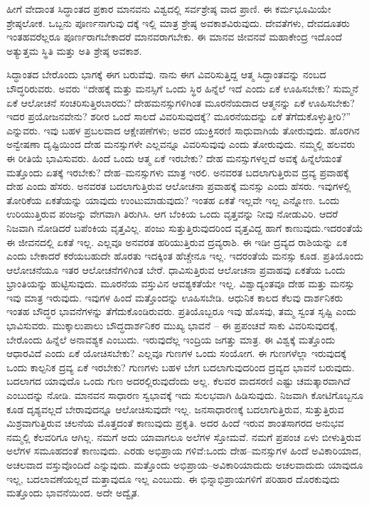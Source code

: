 ಹೀಗೆ ವೇದಾಂತ ಸಿದ್ಧಾಂತದ ಪ್ರಕಾರ ಮಾನವನು ವಿಶ್ವದಲ್ಲಿ ಸರ್ವಶ್ರೇಷ್ಠ ವಾದ ಪ್ರಾಣಿ. ಈ ಕರ್ಮಭೂಮಿಯೇ ಶ್ರೇಷ್ಠಲೋಕ. ಒಬ್ಬನು ಪೂರ್ಣನಾಗುವು ದಕ್ಕೆ ಇಲ್ಲಿ ಮಾತ್ರ ಶ್ರೇಷ್ಠ ಅವಕಾಶವಿರುವುದು. ದೇವತೆಗಳು, ದೇವದೂತರು ಇಂತಹವರೆಲ್ಲರೂ ಪೂರ್ಣರಾಗಬೇಕಾದರೆ ಮಾನವರಾಗಬೇಕು. ಈ ಮಾನವ ಜೀವನವೆ ಮಹಾಕೇಂದ್ರ ಇದೊಂದೆ ಅತ್ಯುತ್ತಮ ಸ್ಥಿತಿ ಮತ್ತು ಅತಿ ಶ್ರೇಷ್ಠ ಅವಕಾಶ.

ಸಿದ್ಧಾಂತದ ಬೇರೊಂದು ಭಾಗಕ್ಕೆ ಈಗ ಬರುವೆವು. ನಾನು ಈಗ ವಿವರಿಸುತ್ತಿದ್ದ ಆತ್ಮ ಸಿದ್ಧಾಂತವನ್ನು ನಂಬದ ಬೌದ್ಧರಿರುವರು. ಅವರು “ದೇಹಕ್ಕೆ ಮತ್ತು ಮನಸ್ಸಿಗೆ ಒಂದು ಸ್ಥಿರ ಹಿನ್ನೆಲೆ ಇದೆ ಎಂದು ಏಕೆ ಊಹಿಸಬೇಕು? ಸುಮ್ಮನೆ ಏಕೆ ಆಲೋಚನೆ ಸಂಚರಿಸುತ್ತಿರಬಾರದು? ದೇಹಮನಸ್ಸುಗಳಿಗಿಂತ ಮೂರನೆಯದಾದ ಆತ್ಮನನ್ನು ಏಕೆ ಊಹಿಸಬೇಕು? ಇದರ ಪ್ರಯೋಜನವೇನು? ಶರೀರ ಒಂದೆ ಸಾಲದೆ ವಿವರಿಸುವುದಕ್ಕೆ? ಮೂರನೆಯದನ್ನು ಏಕೆ ತೆಗೆದುಕೊಳ್ಳುತ್ತೀರಿ?” ಎನ್ನುವರು. ಇವು ಬಹಳ ಪ್ರಬಲವಾದ ಆಕ್ಷೇಪಣೆಗಳು; ಅವರ ಯುಕ್ತಿಸರಣಿ ಸಾಧುವಾಗಿಯೆ ತೋರುವುದು. ಹೊರಗಿನ ಅನ್ವೇಷಣಾ ದೃಷ್ಟಿಯಿಂದ ದೇಹ ಮನಸ್ಸುಗಳೇ ಎಲ್ಲವನ್ನೂ ವಿವರಿಸುವುವು ಎಂದು ತೋರುವುದು. ನಮ್ಮಲ್ಲಿ ಹಲವರು ಈ ರೀತಿಯೆ ಭಾವಿಸುವರು. ಹಿಂದೆ ಒಂದು ಆತ್ಮ ಏಕೆ ಇರಬೇಕು? ದೇಹ ಮನಸ್ಸುಗಳಲ್ಲದೆ ಅವಕ್ಕೆ ಹಿನ್ನೆಲೆಯಂತೆ ಮತ್ತೊಂದು ಏತಕ್ಕೆ ಇರಬೇಕು? ದೇಹ–ಮನಸ್ಸುಗಳು ಮಾತ್ರ ಇರಲಿ. ಅನವರತ ಬದಲಾಗುತ್ತಿರುವ ದ್ರವ್ಯ ಪ್ರವಾಹಕ್ಕೆ ದೇಹ ಎಂದು ಹೆಸರು. ಅನವರತ ಬದಲಾಗುತ್ತಿರುವ ಆಲೋಚನಾ ಪ್ರವಾಹಕ್ಕೆ ಮನಸ್ಸು ಎಂದು ಹೆಸರು. ಇವುಗಳಲ್ಲಿ ತೋರಿಕೆಯ ಏಕತೆಯನ್ನು ಯಾವುದು ಉಂಟುಮಾಡುವುದು? ಇಂತಹ ಏಕತೆ ಇಲ್ಲವೇ ಇಲ್ಲ ಎನ್ನೋಣ. ಒಂದು ಉರಿಯುತ್ತಿರುವ ಪಂಜನ್ನು ವೇಗವಾಗಿ ತಿರುಗಿಸಿ. ಆಗ ಬೆಂಕಿಯ ಒಂದು ವೃತ್ತವನ್ನು ನೀವು ನೋಡುವಿರಿ. ಆದರೆ ನಿಜವಾಗಿ ನೋಡಿದರೆ ಬಪೆಂಕಿಯ ವೃತ್ತವಿಲ್ಲ. ಪಂಜು ಸುತ್ತುತ್ತಿರುವುದರಿಂದ ವೃತ್ತವಿದ್ದ ಹಾಗೆ ಕಾಣುವುದು.ಇದರಂತೆಯೆ ಈ ಜೀವನದಲ್ಲಿ ಏಕತೆ ಇಲ್ಲ. ಎಲ್ಲವೂ ಅನವರತ ಹರಿಯುತ್ತಿರುವ ದ್ರವ್ಯರಾಶಿ. ಈ ಇಡೀ ದ್ರವ್ಯದ ರಾಶಿಯನ್ನು ಏಕ ಎಂದು ಬೇಕಾದರೆ ಕರೆಯಬಹುದೇ ಹೊರತು ಇದಕ್ಕಿಂತ ಹೆಚ್ಚೇನೂ ಇಲ್ಲ. ಇದರಂತೆಯೆ ಮನಸ್ಸು ಕೂಡ. ಪ್ರತಿಯೊಂದು ಆಲೋಚನೆಯೂ ಇತರ ಆಲೋಚನೆಗಳಿಗಿಂತ ಬೇರೆ. ಧಾವಿಸುತ್ತಿರುವ ಆಲೋಚನಾ ಪ್ರವಾಹವು ಏಕತೆಯ ಒಂದು ಭ್ರಾಂತಿಯನ್ನು ಹುಟ್ಟಿಸುವುದು. ಮೂರನೆಯ ವಸ್ತುವಿನ ಆವಶ್ಯಕತೆಯೇ ಇಲ್ಲ. ವಿಶ್ವಾದ್ಯಂತವೂ ದೇಹ ಮತ್ತು ಮನಸ್ಸು ಇವು ಮಾತ್ರ ಇರುವುದು. ಇವುಗಳ ಹಿಂದೆ ಮತ್ತೊಂದನ್ನು ಊಹಿಸಬೇಡಿ. ಆಧುನಿಕ ಕಾಲದ ಕೆಲವು ದಾರ್ಶನಿಕರು ಇಂತಹ ಬೌದ್ಧರ ಭಾವನೆಗಳನ್ನು ತೆಗೆದುಕೊಂಡಿರುವರು. ಪ್ರತಿಯೊಬ್ಬರೂ ಇವು ಹೊಸವು, ತಮ್ಮ ಸ್ವಂತ ಸೃಷ್ಟಿ ಎಂದು ಭಾವಿಸುವರು. ಮುಕ್ಕಾಲುಪಾಲು ಬೌದ್ಧದಾರ್ಶನಿಕರ ಮುಖ್ಯ ಭಾವನೆ – ಈ ಪ್ರಪಂಚವೆ ಸಾಕು ವಿವರಿಸುವುದಕ್ಕೆ, ಬೇರೊಂದು ಹಿನ್ನೆಲೆ ಅನಾವಶ್ಯಕ ಎಂಬುದು. ಇರುವುದೆಲ್ಲ ಇಂದ್ರಿಯ ಜಗತ್ತು ಮಾತ್ರ. ಈ ವಿಶ್ವಕ್ಕೆ ಮತ್ತೊಂದು ಆಧಾರವಿದೆ ಎಂದು ಏಕೆ ಯೋಚಿಸಬೇಕು? ಎಲ್ಲವೂ ಗುಣಗಳ ಒಂದು ಸಂಯೋಗ. ಈ ಗುಣಗಳೆಲ್ಲಾ ಇರುವುದಕ್ಕೆ ಒಂದು ಕಾಲ್ಪನಿಕ ದ್ರವ್ಯ ಏಕೆ ಇರಬೇಕು? ಗುಣಗಳು ಬಹಳ ಬೇಗ ಬದಲಾಗುವುದರಿಂದ ದ್ರವ್ಯದ ಭಾವನೆ ಬರುವುದು. ಬದಲಾಗದ ಯಾವುದೊ ಒಂದು ಗುಣ ಅದರಲ್ಲಿರುವುದೆಂದು ಅಲ್ಲ. ಕೆಲವರ ವಾದಸರಣಿ ಎಷ್ಟು ಚಮತ್ಕಾರವಾಗಿದೆ ಎಂಬುದನ್ನು ನೋಡಿ. ಮಾನವನ ಸಾಧಾರಣ ಸ್ವಭಾವಕ್ಕೆ ಇದು ಸುಲಭವಾಗಿ ಹಿಡಿಸುವುದು. ನಿಜವಾಗಿ ಕೋಟಿಗೊಬ್ಬನೂ ಕೂಡ ದೃಶ್ಯವಲ್ಲದೆ ಬೇರಾವುದನ್ನೂ ಆಲೋಚಿಸುವುದೇ ಇಲ್ಲ. ಜನಸಾಧಾರಣಕ್ಕೆ ಬದಲಾಗುತ್ತಿರುವ, ಸುತ್ತುತ್ತಿರುವ ಮಿಶ್ರವಾಗುತ್ತಿರುವ ಚಲನೆಯ ಮೊತ್ತದಂತೆ ಕಾಣುವುದು ಪ್ರಕೃತಿ. ಅದರ ಹಿಂದೆ ಇರುವ ಶಾಂತಸಾಗರದ ಅನುಭವ ನಮ್ಮಲ್ಲಿ ಕೆಲವರಿಗೂ ಆಗಿಲ್ಲ. ನಮಗೆ ಅದು ಯಾವಾಗಲೂ ಅಲೆಗಳ ಸ್ತೋಮವೆ. ನಮಗೆ ಪ್ರಪಂಚ ಏಳು ಬೀಳುತ್ತಿರುವ ಅಲೆಗಳ ಸಮೂಹದಂತೆ ಕಾಣುವುದು. ಎರಡು ಅಭಿಪ್ರಾಯ ಗಳಿವೆ:ಒಂದು ದೇಹ–ಮನಸ್ಸುಗಳ ಹಿಂದೆ ಅವಿಕಾರಿಯಾದ, ಅಚಲವಾದ ವಸ್ತುವೊಂದಿದೆ ಎನ್ನುವುದು. ಮತ್ತೊಂದು ಅಭಿಪ್ರಾಯ–ಅವಿಕಾರಿಯಾದುದು ಅಚಲವಾದುದು ಯಾವುದೂ ಇಲ್ಲ, ಬದಲಾವಣೆಯಲ್ಲದೆ ಮತ್ತಾವುದೂ ಇಲ್ಲ ಎಂಬುದು. ಈ ಭಿನ್ನಾಭಿಪ್ರಾಯಗಳಿಗೆ ಪರಿಹಾರ ದೊರಕುವುದು ಮತ್ತೊಂದು ಭಾವನೆಯಿಂದ. ಅದೇ ಅದ್ವೈತ.

